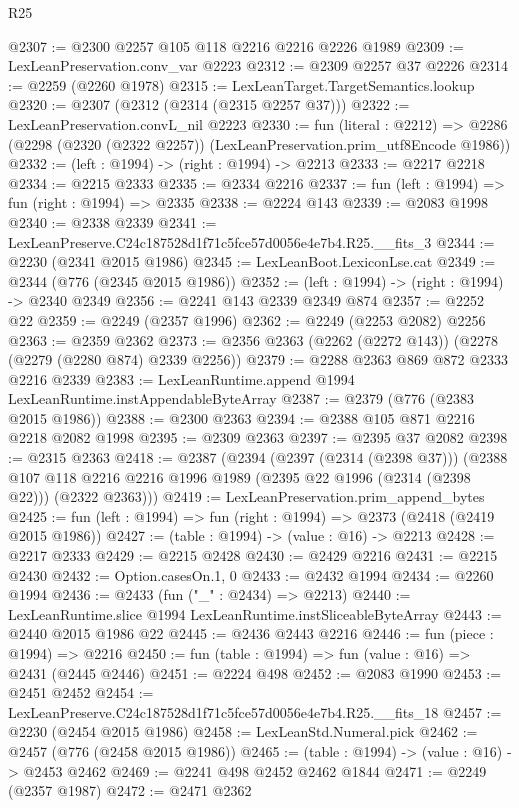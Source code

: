 \begin{lexlean}{R25}
\begin{coremodule}
@2307 := @2300 @2257 @105 @118 @2216 @2216 @2226 @1989
@2309 := LexLeanPreservation.conv_var @2223
@2312 := @2309 @2257 @37 @2226
@2314 := @2259 (@2260 @1978)
@2315 := LexLeanTarget.TargetSemantics.lookup
@2320 := @2307 (@2312 (@2314 (@2315 @2257 @37)))
@2322 := LexLeanPreservation.convL_nil @2223
@2330 := fun (literal : @2212) =>
  @2286 (@2298 (@2320 (@2322 @2257)) (LexLeanPreservation.prim_utf8Encode @1986))
@2332 := (left : @1994) -> (right : @1994) -> @2213
@2333 := @2217 @2218
@2334 := @2215 @2333
@2335 := @2334 @2216
@2337 := fun (left : @1994) => fun (right : @1994) => @2335
@2338 := @2224 @143
@2339 := @2083 @1998
@2340 := @2338 @2339
@2341 := LexLeanPreserve.C24c187528d1f71c5fce57d0056e4e7b4.R25.__fits_3
@2344 := @2230 (@2341 @2015 @1986)
@2345 := LexLeanBoot.LexiconLse.cat
@2349 := @2344 (@776 (@2345 @2015 @1986))
@2352 := (left : @1994) -> (right : @1994) -> @2340 @2349
@2356 := @2241 @143 @2339 @2349 @874
@2357 := @2252 @22
@2359 := @2249 (@2357 @1996)
@2362 := @2249 (@2253 @2082) @2256
@2363 := @2359 @2362
@2373 := @2356 @2363 (@2262 (@2272 @143)) (@2278 (@2279 (@2280 @874) @2339 @2256))
@2379 := @2288 @2363 @869 @872 @2333 @2216 @2339
@2383 := LexLeanRuntime.append @1994 LexLeanRuntime.instAppendableByteArray
@2387 := @2379 (@776 (@2383 @2015 @1986))
@2388 := @2300 @2363
@2394 := @2388 @105 @871 @2216 @2218 @2082 @1998
@2395 := @2309 @2363
@2397 := @2395 @37 @2082
@2398 := @2315 @2363
@2418 := @2387
    (@2394
      (@2397 (@2314 (@2398 @37)))
      (@2388 @107 @118 @2216 @2216 @1996 @1989 (@2395 @22 @1996 (@2314 (@2398 @22))) (@2322 @2363)))
@2419 := LexLeanPreservation.prim_append_bytes
@2425 := fun (left : @1994) => fun (right : @1994) => @2373 (@2418 (@2419 @2015 @1986))
@2427 := (table : @1994) -> (value : @16) -> @2213
@2428 := @2217 @2333
@2429 := @2215 @2428
@2430 := @2429 @2216
@2431 := @2215 @2430
@2432 := Option.casesOn.{1, 0}
@2433 := @2432 @1994
@2434 := @2260 @1994
@2436 := @2433 (fun ("_" : @2434) => @2213)
@2440 := LexLeanRuntime.slice @1994 LexLeanRuntime.instSliceableByteArray
@2443 := @2440 @2015 @1986 @22
@2445 := @2436 @2443 @2216
@2446 := fun (piece : @1994) => @2216
@2450 := fun (table : @1994) => fun (value : @16) => @2431 (@2445 @2446)
@2451 := @2224 @498
@2452 := @2083 @1990
@2453 := @2451 @2452
@2454 := LexLeanPreserve.C24c187528d1f71c5fce57d0056e4e7b4.R25.__fits_18
@2457 := @2230 (@2454 @2015 @1986)
@2458 := LexLeanStd.Numeral.pick
@2462 := @2457 (@776 (@2458 @2015 @1986))
@2465 := (table : @1994) -> (value : @16) -> @2453 @2462
@2469 := @2241 @498 @2452 @2462 @1844
@2471 := @2249 (@2357 @1987)
@2472 := @2471 @2362

\end{coremodule}
\end{lexlean}
